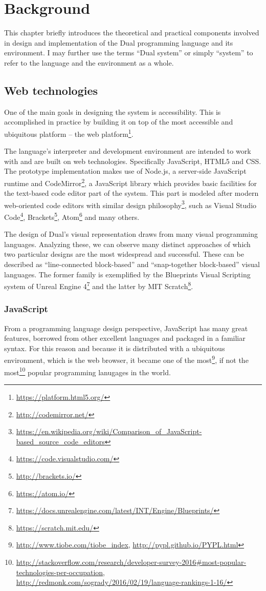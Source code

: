 \chapter{Background}\label{chap:background}
This chapter briefly introduces the theoretical and practical components involved in design and implementation of the Dual programming language and its environment. I may further use the terms ``Dual system'' or simply ``system'' to refer to the language and the environment as a whole.

\section{Web technologies}
One of the main goals in designing the system is accessibility. This is accomplished in practice by building it on top of the most accessible and ubiquitous platform -- the web platform\footnote{\url{https://platform.html5.org/}}.

The language's interpreter and development environment are intended to work with and are built on web technologies. Specifically JavaScript, HTML5 and CSS. The prototype implementation makes use of Node.js, a server-side JavaScript runtime and CodeMirror\footnote{\url{http://codemirror.net/}}, a JavaScript library which provides basic facilities for the text-based code editor part of the system. This part is modeled after modern web-oriented code editors with similar design philosophy\footnote{\url{https://en.wikipedia.org/wiki/Comparison_of_JavaScript-based_source_code_editors}}, such as Visual Studio Code\footnote{\url{https://code.visualstudio.com/}}, Brackets\footnote{\url{http://brackets.io/}}, Atom\footnote{\url{https://atom.io/}} and many others.

The design of Dual's visual representation draws from many visual programming languages. Analyzing these, we can observe many distinct approaches of which two particular designs are the most widespread and successful. These can be described as ``line-connected block-based'' and ``snap-together block-based'' visual languages. The former family is exemplified by the Blueprints Visual Scripting system of Unreal Engine 4\footnote{\url{https://docs.unrealengine.com/latest/INT/Engine/Blueprints/}} and the latter by MIT Scratch\footnote{\url{https://scratch.mit.edu/}}.

\subsection{JavaScript}
From a programming language design perspective, JavaScript has many great features, borrowed from other excellent languages and packaged in a familiar syntax. For this reason and because it is distributed with a ubiquitous environment, which is the web browser, it became one of the most\footnote{\url{http://www.tiobe.com/tiobe_index}, \url{http://pypl.github.io/PYPL.html}}, if not the most\footnote{\url{http://stackoverflow.com/research/developer-survey-2016\#most-popular-technologies-per-occupation}, \url{http://redmonk.com/sogrady/2016/02/19/language-rankings-1-16/}} popular programming lanugages in the world.

